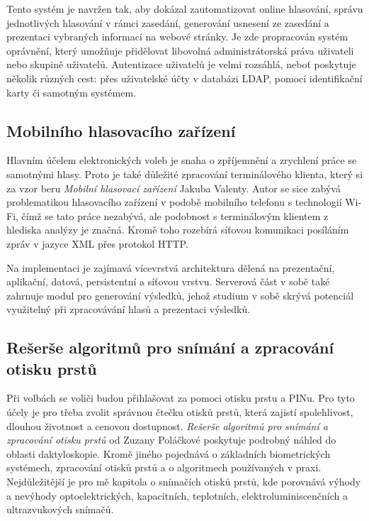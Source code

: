\documentclass[11pt,twoside,a4paper]{book}
\begin{document}
Tento systém je navržen tak, aby dokázal zautomatizovat online hlasování, správu jednotlivých hlasování v rámci zasedání, generování usnesení ze zasedání a prezentaci vybraných informací na webové stránky. Je zde propracován systém oprávnění, který umožňuje přidělovat libovolná administrátorská práva uživateli nebo skupině uživatelů. Autentizace uživatelů je velmi rozsáhlá, neboť poskytuje několik různých cest: přes uživatelské účty v databázi LDAP, pomocí identifikační karty či samotným systémem. 

\subsection{Mobilního hlasovacího zařízení}

Hlavním účelem elektronických voleb je snaha o zpříjemnění a zrychlení práce se samotnými hlasy. Proto je také důležité zpracování terminálového klienta, který si za vzor beru \textit{Mobilní hlasovací zařízení} \cite{art:valenta} Jakuba Valenty. Autor se sice zabývá problematikou hlasovacího zařízení v podobě mobilního telefonu s technologií Wi-Fi, čímž se tato práce nezabývá, ale podobnost s terminálovým klientem z hlediska analýzy je značná. Kromě toho rozebírá síťovou komunikaci posíláním zpráv v jazyce XML přes protokol HTTP.

Na implementaci je zajímavá vícevrstvá architektura dělená na prezentační, aplikační, datová, persistentní a síťovou vrstvu. Serverová část v sobě také zahrnuje modul pro generování výsledků, jehož studium v sobě skrývá potenciál využitelný při zpracovávání hlasů a prezentaci výsledků. 

\subsection{Rešerše algoritmů pro snímání a zpracování otisku prstů} \label{sec:reserse_otisky}

Při volbách se voliči budou přihlašovat za pomoci otisku prstu a PINu. Pro tyto účely je pro třeba zvolit správnou čtečku otisků prstů, která zajistí spolehlivost, dlouhou životnost a cenovou dostupnost. \textit{Rešerše algoritmů pro snímání a zpracování otisku prstů} \cite{art:polackova} od Zuzany Poláčkové poskytuje podrobný náhled do oblasti daktyloskopie. Kromě jiného pojednává o základních biometrických systémech, zpracování otisků prstů a o algoritmech používaných v praxi. Nejdůležitější je pro mě kapitola o snímačích otisků prstů, kde porovnává výhody a nevýhody optoelektrických, kapacitních, teplotních, elektroluminiscenčních a ultrazvukových snímačů.
\end{document}
